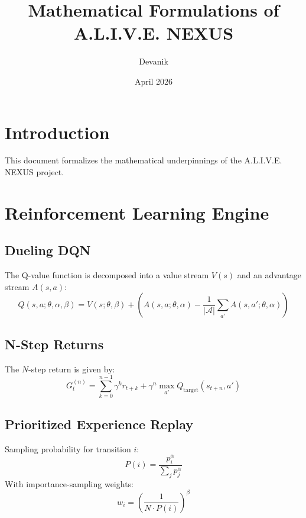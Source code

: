 \documentclass{article}
\title{Mathematical Formulations of A.L.I.V.E. NEXUS}
\author{Devanik}
\date{April 2026}
\begin{document}
\maketitle

\section{Introduction}
This document formalizes the mathematical underpinnings of the A.L.I.V.E. NEXUS project.

\section{Reinforcement Learning Engine}
\subsection{Dueling DQN}
The Q-value function is decomposed into a value stream $V(s)$ and an advantage stream $A(s, a)$:
\begin{equation}
Q(s, a; \theta, \alpha, \beta) = V(s; \theta, \beta) + \left( A(s, a; \theta, \alpha) - \frac{1}{|\mathcal{A}|} \sum_{a'} A(s, a'; \theta, \alpha) \right)
\end{equation}

\subsection{N-Step Returns}
The $N$-step return is given by:
\begin{equation}
G_t^{(n)} = \sum_{k=0}^{n-1} \gamma^k r_{t+k} + \gamma^n \max_{a'} Q_{\text{target}}(s_{t+n}, a')
\end{equation}

\subsection{Prioritized Experience Replay}
Sampling probability for transition $i$:
\begin{equation}
P(i) = \frac{p_i^{\alpha}}{\sum_j p_j^{\alpha}}
\end{equation}
With importance-sampling weights:
\begin{equation}
w_i = \left( \frac{1}{N \cdot P(i)} \right)^{\beta}
\end{equation}
\end{document}

